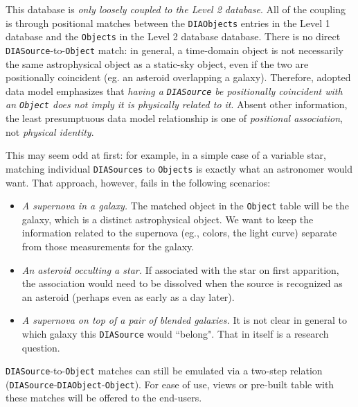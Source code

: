 \documentclass[12pt]{article}
\newcommand{\code}[1]{\texttt{#1}}
\newcommand{\DIASource}{\code{DIASource}\xspace}
\newcommand{\DIASources}{\code{DIASources}\xspace}
\newcommand{\DIAObject}{\code{DIAObject}\xspace}
\newcommand{\DIAObjects}{\code{DIAObjects}\xspace}
\newcommand{\DB}{{Level 1 database}\xspace}
\newcommand{\DR}{{Level 2 database}\xspace}
\newcommand{\Object}{\code{Object}\xspace}
\newcommand{\Objects}{\code{Objects}\xspace}
\newcommand{\SSObject}{\code{SSObject}\xspace}
\begin{document}
This database is {\em only loosely coupled to the \DR}. All of the coupling is through positional matches between the \DIAObjects entries in the \DB and the \Objects in the \DR database. There is no direct \DIASource-to-\Object match:
in general, a time-domain object is not necessarily the same astrophysical object as a static-sky object, even if the two are
positionally coincident (eg. an asteroid overlapping a galaxy).
Therefore, adopted data model emphasizes that {\em having a \DIASource be positionally coincident with an \Object does not imply it is physically related to it}. Absent other information, the least presumptuous data model relationship is one of {\em positional association}, not {\em physical identity}.

This may seem odd at first: for example, in a simple case of a variable star, matching individual \DIASources to \Objects is exactly what an astronomer would want. That approach, however, fails in the following scenarios:
\begin{itemize}
\item {\em A supernova in a galaxy.} The matched object in the \Object table will be the galaxy, which is a distinct astrophysical object. We want to keep the information related to the supernova (eg., colors, the light curve) separate from those measurements for the galaxy.
\item {\em An asteroid occulting a star.} If associated with the star on first apparition, the association would need to be dissolved when the source is recognized as an asteroid (perhaps even as early as a day later).
\item {\em A supernova on top of a pair of blended galaxies.} It is not clear in general to which galaxy this \DIASource would ``belong". That in itself is a research question.
\end{itemize}

\vspace{1ex}
\DIASource-to-\Object matches can still be emulated via a two-step relation (\DIASource-\DIAObject-\Object). For ease of use, views or pre-built table with these matches will be offered to the end-users.

\end{document}
